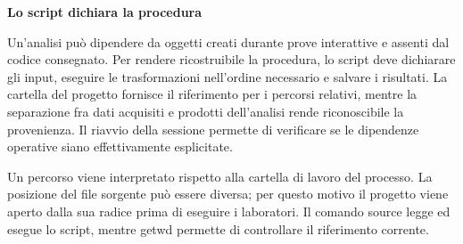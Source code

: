 \documentclass[12pt,aspectratio=1610]{beamer}
\begin{document}
\begin{frame}[plain]
\end{frame}
\begin{lrbox}{\TitleBox}\begin{minipage}[t]{18.2cm}\raggedright\sloppy\color{Ink}\fontsize{20.7}{24}\selectfont \bfseries\color{Navy}Lo script dichiara la procedura\end{minipage}\end{lrbox}
\begin{lrbox}{\BodyBox}\begin{minipage}[t]{10.25cm}\raggedright\sloppy\color{Ink}\fontsize{12.4}{16.4}\selectfont Un’analisi può dipendere da oggetti creati durante prove interattive e assenti dal codice consegnato. Per rendere ricostruibile la procedura, lo script deve dichiarare gli input, eseguire le trasformazioni nell’ordine necessario e salvare i risultati. La cartella del progetto fornisce il riferimento per i percorsi relativi, mentre la separazione fra dati acquisiti e prodotti dell’analisi rende riconoscibile la provenienza. Il riavvio della sessione permette di verificare se le dipendenze operative siano effettivamente esplicitate.\end{minipage}\end{lrbox}
\begin{lrbox}{\SideBox}\begin{minipage}[t]{7.45cm}\raggedright\sloppy\color{Ink}\fontsize{12.2}{16.1}\selectfont Un percorso viene interpretato rispetto alla cartella di lavoro del processo. La posizione del file sorgente può essere diversa; per questo motivo il progetto viene aperto dalla sua radice prima di eseguire i laboratori. Il comando source legge ed esegue lo script, mentre getwd permette di controllare il riferimento corrente.\end{minipage}\end{lrbox}
\end{document}
